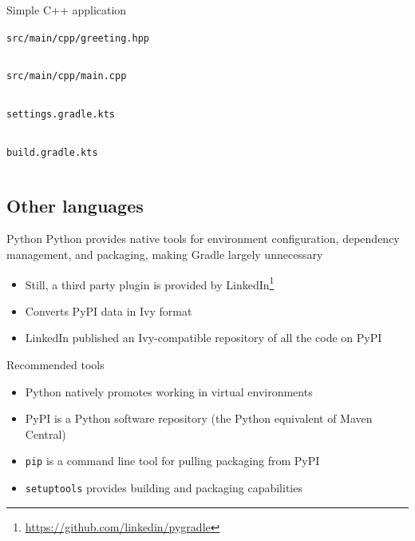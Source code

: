 \documentclass[presentation]{beamer}
\newcommand{\codefile}[4]{
	\begin{block}{\texttt{#2}}
		\inputminted[fontsize=#3,linenos=true,breaklines=true]{#4}{"workspace/#1/#2"}
	\end{block}
}
\newcommand{\ccode}[3]{\codefile{#1}{#2}{#3}{c}}
\newcommand{\kotlin}[3]{\codefile{#1}{#2}{#3}{kotlin}}
\newcommand{\fnurl}[1]{\footnote{\url{#1}}}
\begin{document}
\begin{frame}{Simple C++ application}
    \ccode{18-CPP}{src/main/cpp/greeting.hpp}{\normalsize}
    \ccode{18-CPP}{src/main/cpp/main.cpp}{\normalsize}
    \kotlin{18-CPP}{settings.gradle.kts}{\normalsize}
    \kotlin{18-CPP}{build.gradle.kts}{\normalsize}
\end{frame}

\subsection{Other languages}

\begin{frame}[fragile]{Python}
    Python provides native tools for environment configuration, dependency management, and packaging, making Gradle largely unnecessary
    \begin{itemize}
        \item Still, a third party plugin is provided by LinkedIn\fnurl{https://github.com/linkedin/pygradle}
        \item Converts PyPI data in Ivy format
        \item LinkedIn published an Ivy-compatible repository of all the code on PyPI
    \end{itemize}
    \begin{block}{Recommended tools}
        \begin{itemize}
            \item Python natively promotes working in virtual environments
            \item PyPI is a Python software repository (the Python equivalent of Maven Central)
            \item \texttt{pip} is a command line tool for pulling packaging from PyPI
            \item \texttt{setuptools} provides building and packaging capabilities
        \end{itemize}
    \end{block}
\end{frame}    
\end{document}
